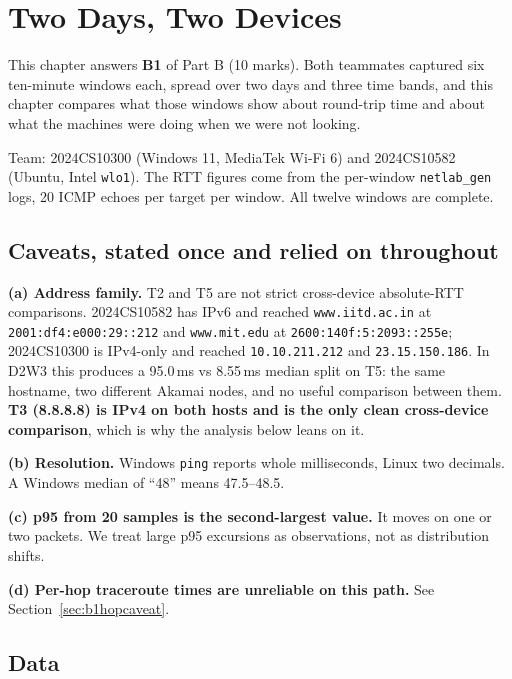 \chapter{Two Days, Two Devices}\label{ch:B1}

This chapter answers \textbf{B1} of Part B (10 marks). Both teammates captured six ten-minute
windows each, spread over two days and three time bands, and this chapter compares what those
windows show about round-trip time and about what the machines were doing when we were not
looking.

Team: 2024CS10300 (Windows 11, MediaTek Wi-Fi 6) and 2024CS10582 (Ubuntu, Intel \texttt{wlo1}).
The RTT figures come from the per-window \texttt{netlab\_gen} logs, 20 ICMP echoes per target per
window. All twelve windows are complete.

\section{Caveats, stated once and relied on throughout}

\textbf{(a) Address family.} T2 and T5 are not strict cross-device absolute-RTT comparisons.
2024CS10582 has IPv6 and reached \texttt{www.iitd.ac.in} at \texttt{2001:df4:e000:29::212} and
\texttt{www.mit.edu} at \texttt{2600:140f:5:2093::255e}; 2024CS10300 is IPv4-only and reached
\texttt{10.10.211.212} and \texttt{23.15.150.186}. In D2W3 this produces a 95.0\,ms vs 8.55\,ms
median split on T5: the same hostname, two different Akamai nodes, and no useful comparison
between them. \textbf{T3 (8.8.8.8) is IPv4 on both hosts and is the only clean cross-device
comparison}, which is why the analysis below leans on it.

\textbf{(b) Resolution.} Windows \texttt{ping} reports whole milliseconds, Linux two decimals. A
Windows median of ``48'' means 47.5--48.5.

\textbf{(c) p95 from 20 samples is the second-largest value.} It moves on one or two packets. We
treat large p95 excursions as observations, not as distribution shifts.

\textbf{(d) Per-hop traceroute times are unreliable on this path.} See
Section~\ref{sec:b1hopcaveat}.

\section{Data}

